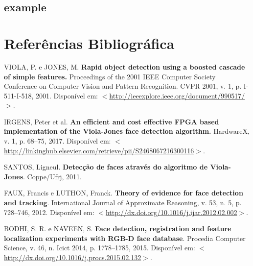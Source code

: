 \documentclass[12pt,a4paper]{article}
\begin{document}


\subsection{example}




%


\newpage
\section{Referências Bibliográfica}
\noindent VIOLA, P. e JONES, M.\textbf{ Rapid object detection using a boosted cascade of simple features.} Proceedings of the 2001 IEEE Computer Society Conference on Computer Vision and Pattern Recognition. CVPR 2001, v. 1, p. I-511-I-518, 2001. Disponível em: $<$\url{http://ieeexplore.ieee.org/document/990517/}$>$.\\\vspace{0.2cm}

\noindent IRGENS, Peter et al. \textbf{An efficient and cost effective FPGA based implementation of the Viola-Jones face detection algorithm.} HardwareX, v. 1, p. 68–75, 2017. Disponível em: $<$\url{http://linkinghub.elsevier.com/retrieve/pii/S2468067216300116}$>$.\\\vspace{0.2cm}

\noindent SANTOS, Ligneul. \textbf{Detecção de faces através do algoritmo de Viola-Jones}. Coppe/Ufrj, 2011.\\\vspace{0.2cm}

\noindent FAUX, Francis e LUTHON, Franck. \textbf{Theory of evidence for face detection and tracking}. International Journal of Approximate Reasoning, v. 53, n. 5, p. 728–746, 2012. Disponível em: $<$\url{http://dx.doi.org/10.1016/j.ijar.2012.02.002}$>$.\\\vspace{0.2cm}

\noindent BODHI, S. R. e NAVEEN, S. \textbf{Face detection, registration and feature localization experiments with RGB-D face database}. Procedia Computer Science, v. 46, n. Icict 2014, p. 1778–1785, 2015. Disponível em: $<$\url{http://dx.doi.org/10.1016/j.procs.2015.02.132}$>$.
\end{document}
